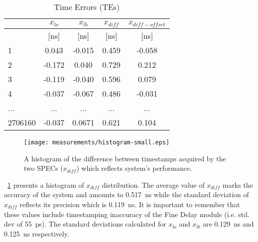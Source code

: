 \begin{table}[!t]
\caption{Time Errors (TEs)}
\centering
\begin{tabular}{| l | c| c | c | c |}          \hline
& \textbf{$x_{lo}$} & \textbf{$x_{lb}$} & \textbf{$x_{diff}$} & \textbf{$x_{diff-offset}$}\\   \hline
       & [ns]  &  [ns]  & [ns]  &  [ns]  \\   \hline
1      & 0.043 & -0.015 & 0.459 & -0.058 \\   \hline
2      &-0.172 &  0.040 & 0.729 &  0.212 \\   \hline
3      &-0.119 & -0.040 & 0.596 &  0.079 \\   \hline
4      &-0.037 & -0.067 & 0.486 & -0.031 \\   \hline
...    &  ...  &  ...   &  ...  &  ...   \\   \hline
2706160&-0.037 & 0.0671 & 0.621 & 0.104 \\   \hline
\end{tabular}
\label{tab:notRawData}
\end{table}

\begin{figure}[!t]
\centering
\texttt{[image: measurements/histogram-small.eps]}
\caption{A histogram of the difference between timestamps 
acquired by the two SPECs ($x_{diff}$) which reflects system's performance.}
\label{fig:teAndHist}
\end{figure}



\figurename~\ref{fig:teAndHist} presents a histogram of $x_{diff}$ distribution. 
The average value of $x_{diff}$ marks the accuracy of the system and amounts to 0.517~ns
while the standard deviation of $x_{diff}$ reflects its precision which is 0.119~ns.
It is important to remember that these values include timestamping inaccuracy of the 
Fine Delay \cite{biblio:fineDelay} module (i.e. std. dev of 55~ps). 
The standard deviations calculated for $x_{lo}$ and $x_{lb}$ are 0.129~ns and 
0.125~ns respectively.

